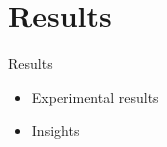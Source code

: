 \section{Results}
\begin{frame}{Results}
  \begin{itemize}
    \item Experimental results
    \item Insights
  \end{itemize}
\end{frame}
